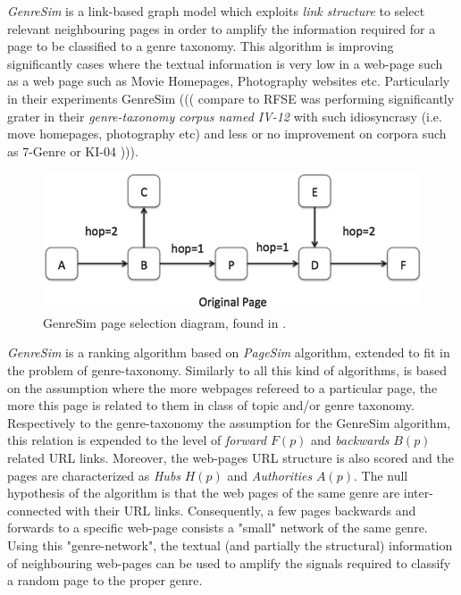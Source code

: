 \textit{GenreSim} is a link-based graph model which exploits \textit{link structure} to select relevant neighbouring pages in order to amplify the information required for a page to be classified to a genre taxonomy. This algorithm is improving significantly cases where the textual information is very low in a web-page such as a web page such as Movie Homepages, Photography websites etc. Particularly in their experiments GenreSim ((( compare to RFSE was performing significantly grater in their \textit{genre-taxonomy corpus named IV-12} with such idiosyncrasy (i.e. move homepages, photography etc) and less or no improvement on corpora such as 7-Genre or KI-04 \parencite{zhu2011enhance,zhu2016exploiting} ))).

\begin{figure}[t]
	\begin{center}
    	\includegraphics[scale=0.95]{Figures/GenreSim_Draw.eps}
		\caption{GenreSim page selection diagram, found in  \parencite{zhu2016exploiting}.}
		\label{fiig:GenreSim_Draw}
	\end{center}
\end{figure}

\textit{GenreSim} is a ranking algorithm based on \textit{PageSim} algorithm, extended to fit in the problem of genre-taxonomy. Similarly to all this kind of algorithms, is based on the assumption where the more webpages refereed to a particular page, the more this page is related to them in class of topic and/or genre taxonomy. Respectively to the genre-taxonomy the assumption for the GenreSim algorithm, this relation is expended to the level of \textit{forward} $F(p)$ and \textit{backwards} $B(p)$ related URL links. Moreover, the web-pages URL structure is also scored and the pages are characterized as \textit{Hubs} $H(p)$ and \textit{Authorities} $A(p)$. The null hypothesis of the algorithm is that the web pages of the same genre are inter-connected with their URL links. Consequently, a few pages backwards and forwards to a specific web-page consists a "small" network of the same genre. Using this "genre-network", the textual (and partially the structural) information of neighbouring web-pages can be used to amplify the signals required to classify a random page to the proper genre.

